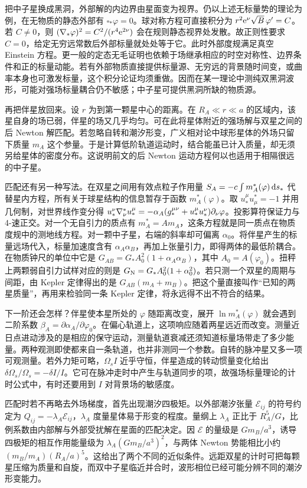 把中子星换成黑洞，外部解的内边界由星面变为视界。仍以上述无标量势的理论为例，在无物质的静态外部有 $\square_*\varphi=0$。球对称方程可直接积分为 $r^2\mathrm{e}^\nu\sqrt B\,\varphi'=C$。若 $C\ne0$，则 $(\nabla_*\varphi)^2=C^2/(r^4\mathrm{e}^{2\nu})$ 会在规则静态视界处发散。故正则性要求 $C=0$，给定无穷远常数后外部标量就处处等于它。此时外部度规满足真空 Einstein 方程。更一般的定态无毛证明也依赖于场继承相应的时空对称性、边界条件和正的标量动能。若有外部物质直接提供标量源、无穷远的背景随时间变，或曲率本身也可激发标量，这个积分论证均须重做。因而在某一理论中测纯双黑洞波形，可能对强场标量耦合仍不敏感；中子星可提供黑洞所缺的物质源。

再把伴星放回来。设 $r$ 为到第一颗星中心的距离。在 $R_A\ll r\ll a$ 的区域内，该星自身的场已弱，伴星的场又几乎均匀。可在此将星体附近的强场解与双星之间的后 Newton 解匹配。若忽略自转和潮汐形变，广义相对论中球形星体的外场只留下质量 $m_A$ 这个参量。于是计算低阶轨道运动时，结合能虽已计入质量，却无须另给星体的密度分布。这说明前文的后 Newton 运动方程何以也适用于相隔很远的中子星。

匹配还有另一种写法。在双星之间用有效点粒子作用量 $S_A=-c\int m_A^*(\varphi)\,\dd s_*$ 代替星内方程，所有关于球星结构的信息暂存于函数 $m_A^*(\varphi)$。取 $u_*^\mu u^*_\mu=-1$ 并用几何制，对世界线作变分得 $u_*^\nu\nabla^*_\nu u_*^\mu =-\alpha_A(g_*^{\mu\nu}+u_*^\mu u_*^\nu)\partial_\nu\varphi$。投影算符保证力与 4-速正交。对一个无自引力的质点有 $m_A^*=A m_A$，这条方程就是同一质点在物质度规中的测地线方程。对一颗中子星，右端的斜率却可偏离 $\alpha_0$。将伴星产生的标量远场代入，标量加速度含有 $\alpha_A\alpha_B$，再加上张量引力，即得两体的最低阶耦合。在物质钟尺的单位中它是 $G_{AB}=G_*A_0^2(1+\alpha_A\alpha_B)$，其中 $A_0=A(\varphi_0)$。扭秤上两颗弱自引力试样对应的则是 $G_{\rm N}=G_*A_0^2(1+\alpha_0^2)$。若只测一个双星的周期与间距，由 Kepler 定律得出的是 $G_{AB}(m_A+m_B)$。把这个量直接叫作“已知的两星质量”，再用来检验同一条 Kepler 定律，将永远得不出不符合的结果。

下一阶还会怎样？伴星使本星所处的 $\varphi$ 随距离改变，展开 $\ln m_A^*(\varphi)$ 就会遇到二阶系数 $\beta_A=\partial\alpha_A/\partial\varphi_0$。在偏心轨道上，这项响应随着两星远近而改变。测量近日点进动涉及的是相应的保守运动，测量轨道衰减还须知道标量场带走了多少能量。两种观测即使都来自一条轨道，也并非测同一个参数。自转的脉冲星又多一项可观测量。若外力矩可略，$\Omega_s I$ 近乎守恒，伴星造成的转动惯量变化给出 $\delta\Omega_s/\Omega_s=-\delta I/I$。它可在脉冲走时中产生与轨道同步的项，故强场标量理论的计时公式中，有时还要用到 $I$ 对背景场的敏感度。

匹配时若不再略去外场梯度，首先出现潮汐四极矩。以外部潮汐张量 $\mathcal E_{ij}$ 的符号约定为 $Q_{ij}=-\lambda_A\mathcal E_{ij}$，$\lambda_A$ 度量星体易于形变的程度。量纲上 $\lambda_A$ 正比于 $R_A^5/G$，比例系数由内部解与外部受扰解在星面的匹配决定。因 $\mathcal E$ 的量级是 $Gm_B/a^3$，诱导四极矩的相互作用能量级为 $\lambda_A(Gm_B/a^3)^2$，与两体 Newton 势能相比小约 $(m_B/m_A)(R_A/a)^5$。这给出了两个不同的近似条件。远距双星的计时可把每颗星压缩为质量和自旋，而双中子星临近并合时，波形相位已经可能分辨不同的潮汐形变能力。

